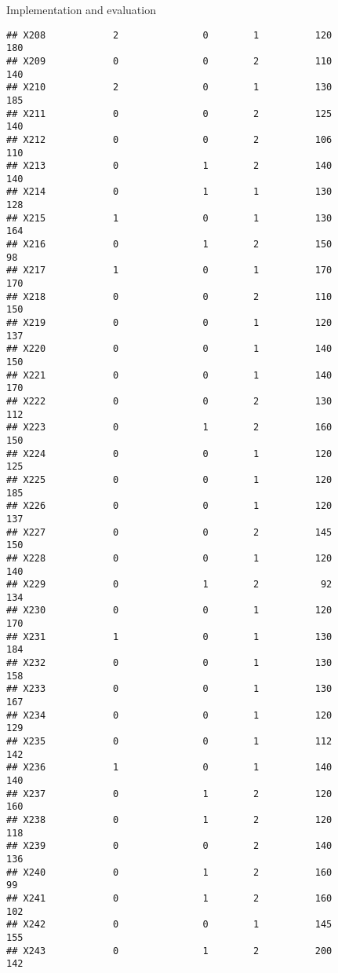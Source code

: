 \documentclass[
  ignorenonframetext,
]{beamer}
\begin{document}
\begin{frame}[fragile]{Implementation and evaluation}
\begin{verbatim}
## X208            2               0        1          120            180
## X209            0               0        2          110            140
## X210            2               0        1          130            185
## X211            0               0        2          125            140
## X212            0               0        2          106            110
## X213            0               1        2          140            140
## X214            0               1        1          130            128
## X215            1               0        1          130            164
## X216            0               1        2          150             98
## X217            1               0        1          170            170
## X218            0               0        2          110            150
## X219            0               0        1          120            137
## X220            0               0        1          140            150
## X221            0               0        1          140            170
## X222            0               0        2          130            112
## X223            0               1        2          160            150
## X224            0               0        1          120            125
## X225            0               0        1          120            185
## X226            0               0        1          120            137
## X227            0               0        2          145            150
## X228            0               0        1          120            140
## X229            0               1        2           92            134
## X230            0               0        1          120            170
## X231            1               0        1          130            184
## X232            0               0        1          130            158
## X233            0               0        1          130            167
## X234            0               0        1          120            129
## X235            0               0        1          112            142
## X236            1               0        1          140            140
## X237            0               1        2          120            160
## X238            0               1        2          120            118
## X239            0               0        2          140            136
## X240            0               1        2          160             99
## X241            0               1        2          160            102
## X242            0               0        1          145            155
## X243            0               1        2          200            142

\end{verbatim}
\end{frame}
\end{document}
